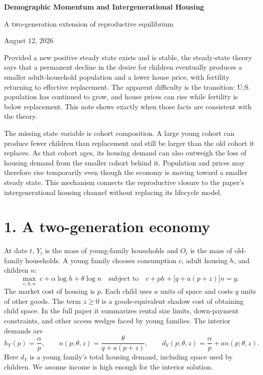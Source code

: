 \documentclass[11pt]{article}
\newcommand{\dY}{d_Y}
\begin{document}
\begin{center}
{\LARGE\bfseries Demographic Momentum and Intergenerational Housing}\par
\vspace{3pt}
{\large A two-generation extension of reproductive equilibrium}\par
\vspace{3pt}
{\small August 12, 2026}
\end{center}

\vspace{-2pt}
Provided a new positive steady state exists and is stable, the steady-state
theory says that a permanent decline in the desire for children eventually
produces a smaller adult-household population and a lower house price, with
fertility returning to effective replacement. The apparent difficulty is
the transition: U.S. population has continued to grow, and house prices can
rise while fertility is below replacement. This note shows exactly when those
facts are consistent with the theory.

The missing state variable is cohort composition. A large young cohort can
produce fewer children than replacement and still be larger than the old cohort
it replaces. As that cohort ages, its housing demand can also outweigh the loss
of housing demand from the smaller cohort behind it. Population and prices may
therefore rise temporarily even though the economy is moving toward a smaller
steady state. This mechanism connects the reproductive closure to the paper's
intergenerational housing channel without replacing its lifecycle model.

\section*{1. A two-generation economy}

At date $t$, $Y_t$ is the mass of young-family households and $O_t$ is the mass
of old-family households. A young family chooses consumption $c$, adult housing $h$, and
children $n$:
\begin{equation}
 \max_{c,h,n}\;c+\alpha\log h+\theta\log n
 \quad\text{subject to}\quad
 c+ph+\bigl[q+a(p+z)\bigr]n=y .
 \label{eq:young_problem}
\end{equation}
The market cost of housing is $p$. Each child uses $a$ units of space and costs
$q$ units of other goods. The term $z\geq0$ is a goods-equivalent shadow cost
of obtaining child space. In the full paper it summarizes rental size limits,
down-payment constraints, and other access wedges faced by young families.
The interior demands are
\begin{equation}
 h_Y(p)=\frac{\alpha}{p},
 \qquad
 n(p;\theta,z)=\frac{\theta}{q+a(p+z)},
 \qquad
 \dY(p;\theta,z)=\frac{\alpha}{p}+a n(p;\theta,z).
 \label{eq:young_demands}
\end{equation}
Here $\dY$ is a young family's total housing demand, including space used by
children. We assume income is high enough for the interior solution.
\end{document}
